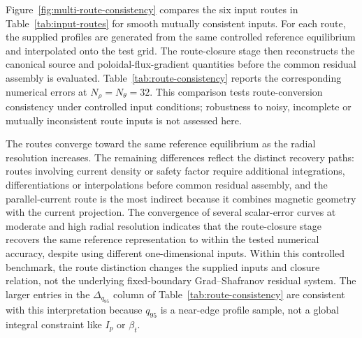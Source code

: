 \documentclass[final, 3p, times]{elsarticle}
\begin{document}
Figure~\ref{fig:multi-route-consistency} compares the six input routes in Table~\ref{tab:input-routes} for smooth mutually consistent inputs. For each route, the supplied profiles are generated from the same controlled reference equilibrium and interpolated onto the test grid. The route-closure stage then reconstructs the canonical source and poloidal-flux-gradient quantities before the common residual assembly is evaluated. Table~\ref{tab:route-consistency} reports the corresponding numerical errors at $N_\rho=N_\theta=32$. This comparison tests route-conversion consistency under controlled input conditions; robustness to noisy, incomplete or mutually inconsistent route inputs is not assessed here.

The routes converge toward the same reference equilibrium as the radial resolution increases. The remaining differences reflect the distinct recovery paths: routes involving current density or safety factor require additional integrations, differentiations or interpolations before common residual assembly, and the parallel-current route is the most indirect because it combines magnetic geometry with the current projection. The convergence of several scalar-error curves at moderate and high radial resolution indicates that the route-closure stage recovers the same reference representation to within the tested numerical accuracy, despite using different one-dimensional inputs. Within this controlled benchmark, the route distinction changes the supplied inputs and closure relation, not the underlying fixed-boundary Grad--Shafranov residual system. The larger entries in the $\Delta_{q_{95}}$ column of Table~\ref{tab:route-consistency} are consistent with this interpretation because $q_{95}$ is a near-edge profile sample, not a global integral constraint like $I_p$ or $\beta_t$.
\end{document}
